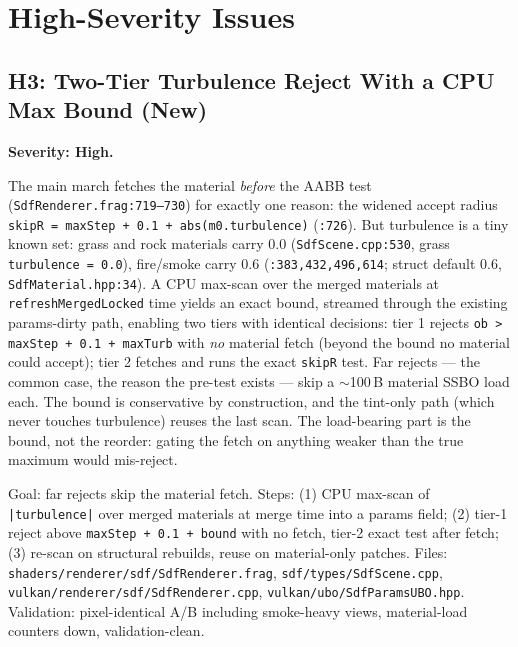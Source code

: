 \documentclass[11pt,a4paper]{article}
\begin{document}
\section{High-Severity Issues}

\subsection{H3: Two-Tier Turbulence Reject With a CPU Max Bound (New)}
\label{sec:h3}

\textbf{Severity: High.}

The main march fetches the material \emph{before} the AABB test
(\texttt{SdfRenderer.frag:719--730}) for exactly one reason: the widened
accept radius \texttt{skipR = maxStep + 0.1 + abs(m0.turbulence)}
(\texttt{:726}). But turbulence is a tiny known set: grass and rock
materials carry 0.0 (\texttt{SdfScene.cpp:530}, grass \texttt{turbulence =
0.0}), fire/smoke carry 0.6 (\texttt{:383,432,496,614}; struct default 0.6,
\texttt{SdfMaterial.hpp:34}). A CPU max-scan over the merged materials at
\texttt{refreshMergedLocked} time yields an exact bound, streamed through
the existing params-dirty path, enabling two tiers with identical
decisions: tier 1 rejects \texttt{ob > maxStep + 0.1 + maxTurb} with
\emph{no} material fetch (beyond the bound no material could accept);
tier 2 fetches and runs the exact \texttt{skipR} test. Far rejects ---
the common case, the reason the pre-test exists --- skip a $\sim$100\,B
material SSBO load each. The bound is conservative by construction, and
the tint-only path (which never touches turbulence) reuses the last scan.
The load-bearing part is the bound, not the reorder: gating the fetch on
anything weaker than the true maximum would mis-reject.

\begin{tcolorbox}[promptbox={Prompt --- H3: max-turbulence two-tier reject}]
Goal: far rejects skip the material fetch. Steps: (1) CPU max-scan of
\texttt{|turbulence|} over merged materials at merge time into a params
field; (2) tier-1 reject above \texttt{maxStep + 0.1 + bound} with no
fetch, tier-2 exact test after fetch; (3) re-scan on structural rebuilds,
reuse on material-only patches. Files:
\texttt{shaders/renderer/sdf/SdfRenderer.frag},
\texttt{sdf/types/SdfScene.cpp},
\texttt{vulkan/renderer/sdf/SdfRenderer.cpp},
\texttt{vulkan/ubo/SdfParamsUBO.hpp}. Validation: pixel-identical A/B
including smoke-heavy views, material-load counters down,
validation-clean.
\end{tcolorbox}
\end{document}
